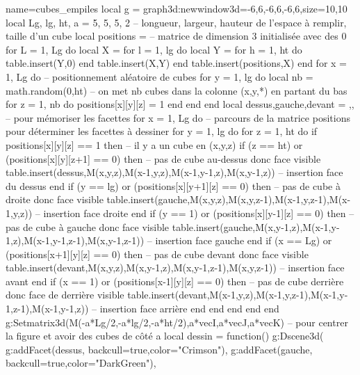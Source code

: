 \documentclass[%
10pt,%
a4paper,%
french,%
]%
{article}%
\newenvironment*{demo}[2][]{%
\gdef\legende{#2}%
\gdef\lab{#1}%
\bgroup
\VerbatimOut{\jobname.tmp}%
}%
{%
\endVerbatimOut%
\egroup%
\inputminted[ignorelexererrors=true,breaklines,bgcolor=Beige,linenos,numbersep=6pt,frame=single,fontsize=\footnotesize]{Lua}{\jobname.tmp}%
\begin{minipage}{0.9\textwidth}
\begin{center}
\captionof{figure}{\legende}\label{\lab}%
%
\end{center}
\end{minipage}
}
\begin{document}
\begin{demo}{Empilement de cubes}
\begin{luadraw}{name=cubes_empiles}
local g = graph3d:new{window3d={-6,6,-6,6,-6,6},size={10,10}}
local Lg, lg, ht, a = 5, 5, 5, 2 -- longueur, largeur, hauteur de l'espace à remplir, taille d'un cube
local positions = {} -- matrice de dimension 3 initialisée avec des 0
for L = 1, Lg do
    local X = {}
    for l = 1, lg do
        local Y = {}
        for h = 1, ht do table.insert(Y,0) end
        table.insert(X,Y)
    end
    table.insert(positions,X)
end
for x = 1, Lg do  -- positionnement aléatoire de cubes
    for y = 1, lg do
        local nb = math.random(0,ht) -- on met nb cubes dans la colonne (x,y,*) en partant du bas
        for z = 1, nb do positions[x][y][z] = 1 end
    end
end
local dessus,gauche,devant = {},{},{} -- pour mémoriser les facettes
for x = 1, Lg do -- parcours de la matrice positions pour déterminer les facettes à dessiner
    for y = 1, lg do
        for z = 1, ht do
            if positions[x][y][z] == 1 then -- il y a un cube en (x,y,z)
                if (z == ht) or (positions[x][y][z+1] == 0) then -- pas de cube au-dessus donc face visible
                    table.insert(dessus,{M(x,y,z),M(x-1,y,z),M(x-1,y-1,z),M(x,y-1,z)}) -- insertion face du dessus
                end
                if (y == lg) or (positions[x][y+1][z] == 0) then -- pas de cube à droite donc face  visible
                    table.insert(gauche,{M(x,y,z),M(x,y,z-1),M(x-1,y,z-1),M(x-1,y,z)}) -- insertion face droite
                end
                if (y == 1) or (positions[x][y-1][z] == 0) then -- pas de cube à gauche donc face visible
                    table.insert(gauche,{M(x,y-1,z),M(x-1,y-1,z),M(x-1,y-1,z-1),M(x,y-1,z-1)}) -- insertion face gauche
                end                    
                if (x == Lg) or (positions[x+1][y][z] == 0) then -- pas de cube devant donc face visible
                    table.insert(devant,{M(x,y,z),M(x,y-1,z),M(x,y-1,z-1),M(x,y,z-1)}) -- insertion face avant
                end
                if (x == 1) or (positions[x-1][y][z] == 0) then -- pas de cube derrière donc face de derrière visible
                    table.insert(devant,{M(x-1,y,z),M(x-1,y,z-1),M(x-1,y-1,z-1),M(x-1,y-1,z)}) -- insertion face arrière
                end
            end
        end
    end
end
g:Setmatrix3d({M(-a*Lg/2,-a*lg/2,-a*ht/2),a*vecI,a*vecJ,a*vecK}) -- pour centrer la figure et avoir des cubes de côté a
local dessin = function()
    g:Dscene3d(
        g:addFacet(dessus, {backcull=true,color="Crimson"}), g:addFacet(gauche, {backcull=true,color="DarkGreen"}),

\end{luadraw}
\end{demo}
\end{document}

